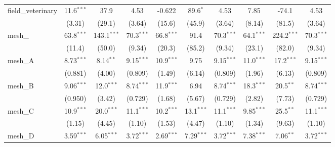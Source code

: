 \begin{tabular}{lccccccccc}
   field\_veterinary                                           & 11.6$^{***}$  & 37.9          & 4.53          & -0.622        & 89.6$^{*}$     & 4.53          & 7.85          & -74.1          & 4.53\\   
                                                               & (3.31)        & (29.1)        & (3.64)        & (15.6)        & (45.9)         & (3.64)        & (8.14)        & (81.5)         & (3.64)\\   
   mesh\_                                                      & 63.8$^{***}$  & 143.1$^{***}$ & 70.3$^{***}$  & 66.8$^{***}$  & 91.4           & 70.3$^{***}$  & 64.1$^{***}$  & 224.2$^{***}$  & 70.3$^{***}$\\   
                                                               & (11.4)        & (50.0)        & (9.34)        & (20.3)        & (85.2)         & (9.34)        & (23.1)        & (82.0)         & (9.34)\\   
   mesh\_A                                                     & 8.73$^{***}$  & 8.14$^{**}$   & 9.15$^{***}$  & 10.9$^{***}$  & 9.75           & 9.15$^{***}$  & 11.0$^{***}$  & 17.2$^{***}$   & 9.15$^{***}$\\   
                                                               & (0.881)       & (4.00)        & (0.809)       & (1.49)        & (6.14)         & (0.809)       & (1.96)        & (6.13)         & (0.809)\\   
   mesh\_B                                                     & 9.06$^{***}$  & 12.0$^{***}$  & 8.74$^{***}$  & 11.9$^{***}$  & 6.94           & 8.74$^{***}$  & 18.3$^{***}$  & 20.5$^{**}$    & 8.74$^{***}$\\   
                                                               & (0.950)       & (3.42)        & (0.729)       & (1.68)        & (5.67)         & (0.729)       & (2.82)        & (7.73)         & (0.729)\\   
   mesh\_C                                                     & 10.9$^{***}$  & 20.0$^{***}$  & 11.1$^{***}$  & 10.2$^{***}$  & 13.1$^{***}$   & 11.1$^{***}$  & 9.85$^{***}$  & 25.5$^{**}$    & 11.1$^{***}$\\   
                                                               & (1.15)        & (4.45)        & (1.10)        & (1.53)        & (4.47)         & (1.10)        & (1.34)        & (9.63)         & (1.10)\\   
   mesh\_D                                                     & 3.59$^{***}$  & 6.05$^{***}$  & 3.72$^{***}$  & 2.69$^{***}$  & 7.29$^{***}$   & 3.72$^{***}$  & 7.38$^{***}$  & 7.06$^{**}$    & 3.72$^{***}$\\   

\end{tabular}
